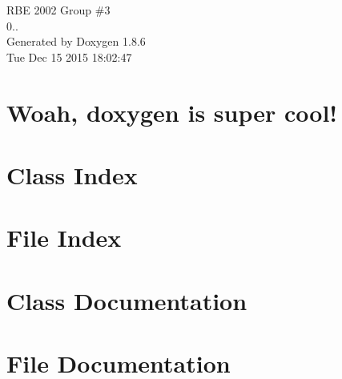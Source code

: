 \documentclass[twoside]{book}
\newcommand{\clearemptydoublepage}{%
  \newpage{\pagestyle{empty}\cleardoublepage}%
}
\begin{document}
\hypersetup{pageanchor=false}
\begin{titlepage}
\vspace*{7cm}
\begin{center}%
{\Large R\-B\-E 2002 Group \#3 \\[1ex]\large 0.. }\\
\vspace*{1cm}
{\large Generated by Doxygen 1.8.6}\\
\vspace*{0.5cm}
{\small Tue Dec 15 2015 18:02:47}\\
\end{center}
\end{titlepage}
\clearemptydoublepage
\tableofcontents
\clearemptydoublepage
{}
\hypersetup{pageanchor=true}

\chapter{Woah, doxygen is super cool!}
\label{index}\hypertarget{index}{}
\chapter{Class Index}

\chapter{File Index}

\chapter{Class Documentation}


















\chapter{File Documentation}




































\newpage
{}
{}
\printindex
\end{document}
